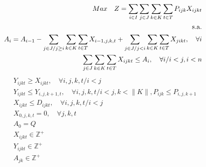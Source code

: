 \begin{eqnarray}
	&& Max \quad Z = \sum_{i\in I} \sum_{j\in J} \sum_{k\in K} \sum_{t\in T} P_{ijk} X_{ijkt} \label{eq: m1_ecu1}                                                                    \\
	&& \text{s.a.}  \notag                                                                                                                                                    \\
	&& A_{i} = A_{i-1} - \sum_{j\in J/j \geq i}\sum_{k\in K}\sum_{t\in T}X_{i-1,j,k,t} + \sum_{j\in J /j<i}\sum_{k\in K}\sum_{t\in T}X_{jikt}, \quad \forall i  \label{eq: m1_ecu2}  \\
	&& \sum_{j \in J}\sum_{k\in K}\sum_{t\in T} X_{ijkt} \leq A_{i} , \quad \forall i/i<j, i < n                                                \label{eq: m1_ecu3}                  
\end{eqnarray}
\begin{eqnarray}
	&& Y_{ijkt} \geq X_{ijkt},  \quad \forall i,j,k,t/ i < j                                                                          \label{eq: m1_ecu4}                            \\
	&& Y_{ijkt} \leq Y_{i,j,k+1,t},  \quad \forall i,j,k,t / i < j, k < \lVert K \rVert,  P_{ijk} \leq P_{i,j,k+1}                      \label{eq: m1_ecu5}                          \\
	&& X_{ijkt} \leq D_{ijkt},  \quad \forall i,j,k,t/ i < j                                                                           \label{eq: m1_ecu6}                           \\[15pt]
	&& X_{0,j,k,t} = 0,     \quad \forall j,k,t                                                                                        \label{eq: m1_ecu7}                           \\
	&& A_{0} = Q                                                                                                                      \label{eq: m1_ecu8}                            \\
	&& X_{ijkt} \in \mathbb{Z}^+                                                                                                   \label{eq: m1_ecu9}                               \\
	&& Y_{ijkt} \in \mathbb{Z}^+                                                                                                   \label{eq: m1_ecu10}                              \\
	&& A_{jk} \in \mathbb{Z}^+                                                                                                   \label{eq: m1_ecu11}
\end{eqnarray}

